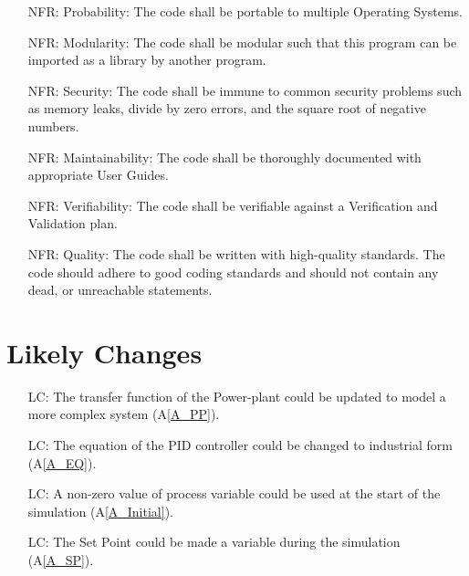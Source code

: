 \documentclass[12pt]{article}
\newcommand{\aref}[1]{A\ref{#1}}
\newcounter{reqnum} %
\newcounter{nfreqnum} %
\newcounter{lcnum} %
\begin{document}
\noindent \begin{itemize}

\item[NFR\refstepcounter{nfreqnum}\thenfreqnum \label{R_Portability}:] Probability:
 The code shall be portable to multiple Operating Systems.

\item[NFR\refstepcounter{nfreqnum}\thenfreqnum \label{R_Modularity}:] Modularity:
The code shall be modular such that this program can be imported as a library
by another program. 

\item[NFR\refstepcounter{nfreqnum}\thenfreqnum \label{R_Security}:] Security:
The code shall be immune to common security problems such as memory leaks,
divide by zero errors, and the square root of negative numbers.

\item[NFR\refstepcounter{nfreqnum}\thenfreqnum \label{R_Maintainability}:] Maintainability:
The code shall be thoroughly documented with appropriate User Guides.

\item[NFR\refstepcounter{nfreqnum}\thenfreqnum \label{R_Verifiable}:] Verifiability: 
The code shall be verifiable against a Verification and Validation plan.

\item[NFR\refstepcounter{nfreqnum}\thenfreqnum \label{R_Quality}:] Quality: The code
shall be written with high-quality standards. The code should adhere to good coding 
standards and should not contain any dead, or unreachable statements.


\end{itemize}

\section{Likely Changes}    

\noindent \begin{itemize}

\item[LC\refstepcounter{lcnum}\thelcnum\label{LC_PP}:]  The transfer function of the Power-plant could be updated 
    to model a more complex system (\aref{A_PP}).
    
\item[LC\refstepcounter{lcnum}\thelcnum\label{LC_EQ}:] The equation of the 
    PID controller could be changed to industrial form (\aref{A_EQ}).
    
\item[LC\refstepcounter{lcnum}\thelcnum\label{LC_Initial}:] A non-zero value
    of process variable could be used at the start of the simulation 
    (\aref{A_Initial}).
    
\item[LC\refstepcounter{lcnum}\thelcnum\label{LC_SP}:] The Set Point could be 
    made a variable during the simulation (\aref{A_SP}).

\end{itemize}
\end{document}
